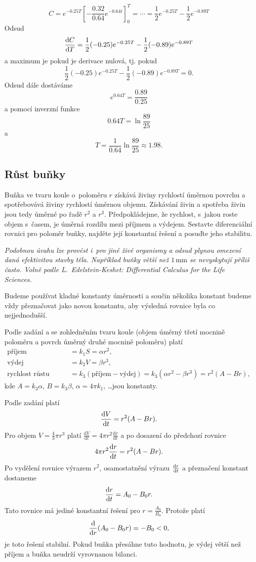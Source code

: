 \reseni
$$C=e^{-0.25 T}\left[-\frac{0.32}{0.64}e^{-0.64 t}\right]_0^T=\cdots
=\frac 12 e^{-0.25T}-\frac 12 e^{-0.89T}$$
Odsud
$$\frac{\mathrm{d}C}{\mathrm{d}T}=
\frac 12(-0.25) e^{-0.25T}-\frac 12 (-0.89) e^{-0.89T}$$
a maximum je pokud je derivace nulová, tj. pokud
$$
\frac 12(-0.25) e^{-0.25T}-\frac 12 (-0.89) e^{-0.89T}=0.$$
Odsud dále dostáváme
$$e^{0.64 T}=\frac{0.89}{0.25}$$
a pomocí inverzní funkce
$${0.64 T}=\ln \frac{89}{25}$$
a
$${ T}=\frac 1{0.64}\ln \frac{89}{25}\approx 1.98.$$

\konec




\subsection{Růst buňky} Buňka ve tvaru koule o poloměru $r$ získává
živiny rychlostí úměrnou povrchu a spotřebovává živiny rychlostí
úměrnou objemu. Získávání živin a spotřeba živin jsou tedy úměrné po
řadě $r^2$ a $r^3$. Předpokládejme, že rychlost, s jakou roste objem s časem, je
úměrná rozdílu mezi příjmem a výdejem. Sestavte diferenciální rovnici
pro poloměr buňky, najděte její konstantní řešení a posuďte jeho
stabilitu. 

\textit{Podobnou
úvahu lze provést i pro jiné živé organismy a odsud plynou omezení
daná efektivitou stavby těla. Například buňky větší než
$1\,\mathrm{mm}$ se nevyskytují příliš často. Volně podle
L.~Edelstein-Keshet: Differential Calculus for the Life Sciences.
}

\reseni

Budeme používat kladné konstanty úměrnosti a součin několika konstant budeme vždy přeznačovat jako novou konstantu, aby výsledná rovnice byla co nejjednodušší.

Podle zadání a se zohledněním tvaru koule (objem úměrný třetí mocnině poloměru a povrch úměrný druhé mocnině poloměru) platí 
$$
\begin{aligned}
  \text{příjem}&=k_1S=\alpha r^2,\\
  \text{výdej}&=k_2V=\beta r^3,\\
  \text{rychlost růstu objemu}&=k_3(  \text{příjem}-  \text{výdej}) =
  k_3(  \alpha r^2 -\beta r^3) =r^2 (A-Br),
\end{aligned}
$$
kde $A=k_3\alpha$, $B=k_3\beta$, $\alpha=4\pi k_1$, \dots jsou konstanty.

Podle zadání platí
$$\frac{\mathrm{d}V}{\mathrm{d}t}=r^2 (A-Br).$$
Pro objem $V=\frac 43 \pi r^3$ platí $\frac {\mathrm dV}{\mathrm dt}=4\pi r^2\frac{\mathrm dr}{\mathrm dt}$ a po dosazení do předchozí rovnice 
$$4\pi r^2\frac{\mathrm{d}r}{\mathrm{d}t}=  r^2 (A-Br).$$
Po vydělení rovnice výrazem $r^2$, osamostatnění výrazu $\frac{\mathrm{d}r}{\mathrm{d}t}$ a přeznačení konstant dostaneme
$$\frac{\mathrm{d}r}{\mathrm{d}t}= A_0-B_0r.$$
Tato rovnice má jediné konstantní řešení pro $r=\frac{A_0}{B_0}$. Protože platí
$$\frac{\mathrm{d}}{\mathrm{d}r} (A_0-B_0r)=-B_0<0,$$ je toto řešení stabilní. Pokud buňka přesáhne tuto hodnotu, je výdej větší než příjem a buňka neudrží vyrovnanou bilanci.

